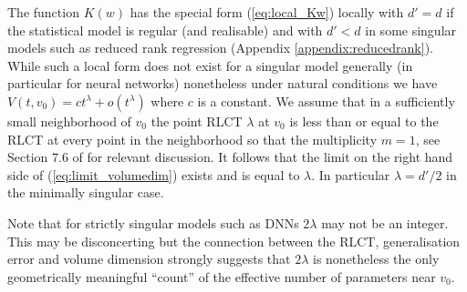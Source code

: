 \documentclass[11pt]{article}
\numberwithin{equation}{section}
\theoremstyle{plain}
\theoremstyle{definition}
\begin{document}
The function $K(w)$ has the special form (\ref{eq:local_Kw}) locally with $d' = d$ if the statistical model is regular (and realisable) and with $d' < d$ in some singular models such as reduced rank regression (Appendix \ref{appendix:reducedrank}). While such a local form does not exist for a singular model generally (in particular for neural networks) nonetheless under natural conditions \citep[Theorem 7.1]{watanabe_algebraic_2009} we have
$
V(t,v_0) = c t^\lambda + o( t^\lambda)
$
where $c$ is a constant. We assume that in a sufficiently small neighborhood of $v_0$ the point RLCT $\lambda$ at $v_0$ \citep[Definition 2.7]{watanabe_algebraic_2009} is less than or equal to the RLCT at every point in the neighborhood so that the multiplicity $m = 1$, see Section 7.6 of \citep{watanabe_algebraic_2009} for relevant discussion.
It follows that the limit on the right hand side of  (\ref{eq:limit_volumedim}) exists and is equal to $\lambda$. In particular $\lambda = d'/2$ in the minimally singular case.

Note that for strictly singular models such as DNNs $2 \lambda$ may not be an integer. This may be disconcerting but the connection between the RLCT, generalisation error and volume dimension strongly suggests that $2 \lambda$ is nonetheless the only geometrically meaningful ``count'' of the effective number of parameters near $v_0$. 
\end{document}
